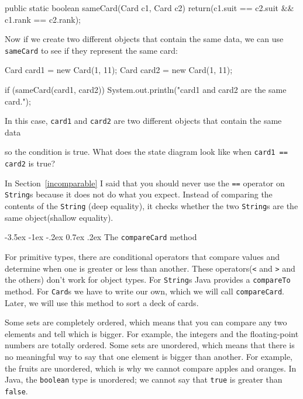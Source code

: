 \documentclass{book}
\makeatletter
\renewcommand{\section}{\@startsection 
    {section} {1} {0mm}%
    {-3.5ex \@plus -1ex \@minus -.2ex}%
    {0.7ex \@plus.2ex}%
    {\normalfont\Large\bfseries}}
\makeatother
\begin{document}
\begin{verbatimtab}
public static boolean sameCard(Card c1, Card c2) {
    return(c1.suit == c2.suit && c1.rank == c2.rank);
}
\end{verbatimtab}
%
Now if we create two different objects that contain the same
data, we can use {\tt sameCard} to see if they represent the
same card:

\begin{verbatimtab}
    Card card1 = new Card(1, 11);
    Card card2 = new Card(1, 11);

    if (sameCard(card1, card2)) {
        System.out.println("card1 and card2 are the same card.");
    }
\end{verbatimtab}
%
In this case, {\tt card1} and {\tt card2}
are two different objects that contain the same data


so the condition is true.  What does the state diagram look like when
{\tt card1 == card2} is true?


In Section~\ref{incomparable} I said that you should never use the
{\tt ==} operator on {\tt String}s because it does not do what you
expect.  Instead of comparing the contents of the {\tt String}
(deep equality), it checks whether the two {\tt String}s are the
same object(shallow equality).


\section{The {\tt compareCard} method}

For primitive types, there are conditional operators that
compare values and determine when one is greater or less
than another.  These operators({\tt <} and {\tt >} and the others)
don't work for object types.  For {\tt String}s Java provides
a {\tt compareTo} method.  For {\tt Card}s we have
to write our own, which we will call {\tt compareCard}.
Later, we will use this method to sort a deck of cards.


Some sets are completely ordered, which means that you can
compare any two elements and tell which is bigger.  For
example, the integers and the floating-point numbers are
totally ordered.  Some sets are unordered, which means that
there is no meaningful way to say that one element is bigger
than another.  For example, the fruits are unordered, which
is why we cannot compare apples and oranges.  In Java,
the {\tt boolean} type is unordered; we cannot say that
{\tt true} is greater than {\tt false}.
\end{document}
